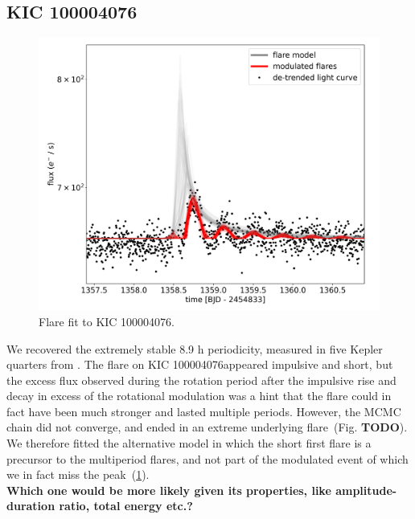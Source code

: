 \documentclass[fleqn,usenatbib,letters]{mnras}%
\newcommand{\FE}{KIC 100004076} %
\begin{document}
\subsection{\FE}
\begin{figure}
	\includegraphics[width=\columnwidth]{figures/18_08_2020_15_38_KIC100004076_flarefit_50retrievals.png}
    \caption{Flare fit to \FE.}
    \label{fig:fit\FE}
\end{figure}
We recovered the extremely stable 8.9 h periodicity, measured in five Kepler quarters from \citep{gizis2013}. The flare on \FE appeared impulsive and short, but the excess flux observed during the rotation period after the impulsive rise and decay in excess of the rotational modulation was a hint that the flare could in fact have been much stronger and lasted multiple periods. However, the MCMC chain did not converge, and ended in an extreme underlying flare~(Fig. \textbf{TODO}). We therefore fitted the alternative model in which the short first flare is a precursor to the multiperiod flares, and not part of the modulated event of which we in fact miss the peak~(\ref{fig:fit\FE}).
\\

\textbf{Which one would be more likely given its properties, like amplitude-duration ratio, total energy etc.?}
\end{document}
